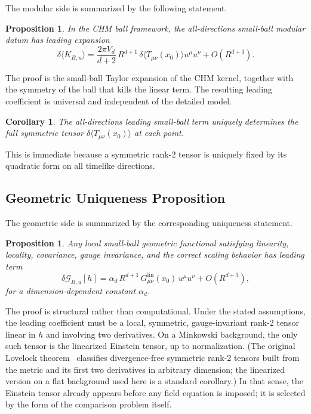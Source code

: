 \documentclass[12pt]{article}
\newtheorem{proposition}[theorem]{Proposition}
\newtheorem{corollary}[theorem]{Corollary}
\theoremstyle{definition}
\theoremstyle{remark}
\begin{document}
The modular side is summarized by the following statement.

\begin{proposition}\label{prop:II.1}
In the CHM ball framework, the all-directions small-ball modular datum has leading expansion
\[
\delta\langle K_{B,u}\rangle
=
\frac{2\pi V_d}{d+2}\,
R^{d+1}\,
\delta\langle T_{\mu\nu}(x_0)\rangle u^\mu u^\nu
+
O(R^{d+3}).
\]
\end{proposition}

The proof is the small-ball Taylor expansion of the CHM kernel, together with the symmetry of the ball that kills the linear term. The resulting leading coefficient is universal and independent of the detailed model.

\begin{corollary}\label{cor:II.1.1}
The all-directions leading small-ball term uniquely determines the full symmetric tensor \(\delta\langle T_{\mu\nu}(x_0)\rangle\) at each point.
\end{corollary}

This is immediate because a symmetric rank-2 tensor is uniquely fixed by its quadratic form on all timelike directions.

\subsection{Geometric Uniqueness Proposition}\label{subsec:4.2}

The geometric side is summarized by the corresponding uniqueness statement.

\begin{proposition}\label{prop:II.3}
Any local small-ball geometric functional satisfying linearity, locality, covariance, gauge invariance, and the correct scaling behavior has leading term
\[
\delta\mathcal{G}_{B,u}[h]
=
\alpha_d\,R^{d+1}\,
G^{\mathrm{lin}}_{\mu\nu}(x_0)\,u^\mu u^\nu
+
O(R^{d+3}),
\]
for a dimension-dependent constant \(\alpha_d\).
\end{proposition}

The proof is structural rather than computational. Under the stated assumptions, the leading coefficient must be a local, symmetric, gauge-invariant rank-2 tensor linear in \(h\) and involving two derivatives. On a Minkowski background, the only such tensor is the linearized Einstein tensor, up to normalization. (The original Lovelock theorem~\cite{Lovelock1971} classifies divergence-free symmetric rank-2 tensors built from the metric and its first two derivatives in arbitrary dimension; the linearized version on a flat background used here is a standard corollary.) In that sense, the Einstein tensor already appears before any field equation is imposed; it is selected by the form of the comparison problem itself.
\end{document}
